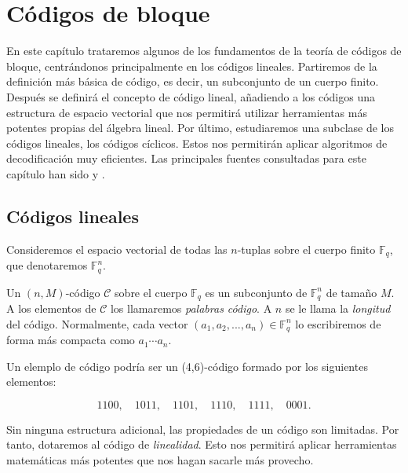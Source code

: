 

\chapter{Códigos de bloque}\label{ch:segundo-capitulo}

En este capítulo trataremos algunos de los fundamentos de la teoría de códigos de bloque, centrándonos principalmente en los códigos lineales. Partiremos de la definición más básica de código, es decir, un subconjunto de un cuerpo finito. Después se definirá el concepto de código lineal, añadiendo a los códigos una estructura de espacio vectorial que nos permitirá utilizar herramientas más potentes propias del álgebra lineal. Por último, estudiaremos una subclase de los códigos lineales, los códigos cíclicos. Estos nos permitirán aplicar algoritmos de decodificación muy eficientes. Las principales fuentes consultadas para este capítulo han sido \cite{Huffman_Pless_2010} y \cite{betten2006error}.


\section{Códigos lineales}\label{sec:1.1}

Consideremos el espacio vectorial de todas las $n$-tuplas sobre el cuerpo finito $\mathds{F}_{q}$, que denotaremos $\mathds{F}_{q}^{n}$.

\begin{definicion}
 Un $(n,M)$-código $\mathcal{C}$ sobre el cuerpo $\mathds{F}_{q}$ es un subconjunto de $\mathds{F}_{q}^{n}$ de tamaño $M$. A los elementos de $\mathcal{C}$ los llamaremos \textit{palabras código}. A $n$ se le llama la \textit{longitud} del código. Normalmente, cada vector $(a_1,a_2,...,a_n) \in \mathds{F}_{q}^{n}$ lo escribiremos de forma más compacta como $a_1\dotsb a_n$.
\end{definicion}

\begin{ejemplo}
Un elemplo de código podría ser un (4,6)-código formado por los siguientes elementos:

$$ 1100, \quad		1011, \quad			1101, \quad			1110,	\quad		1111,	\quad		0001. $$
\end{ejemplo}
Sin ninguna estructura adicional, las propiedades de un código son limitadas. Por tanto, dotaremos al código de \emph{linealidad}. Esto nos permitirá aplicar herramientas matemáticas más potentes que nos hagan sacarle más provecho.

